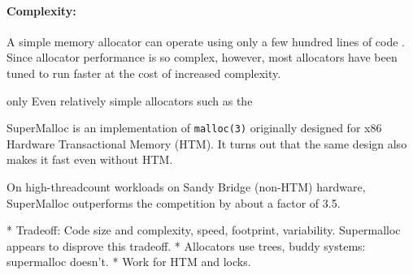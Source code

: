 \documentclass[pldi]{sigplanconf-pldi15}
\begin{document}
{\paragraph{Complexity:}} A simple memory allocator can operate using
only a few hundred lines of code \cite{KernighanRi88}.  Since
allocator performance is so complex, however, most allocators have
been tuned to run faster at the cost of increased complexity.  



only Even relatively simple allocators such as the

SuperMalloc is an implementation of \texttt{malloc(3)} originally designed for
x86 Hardware Transactional Memory (HTM).  
It turns out that the same
design also makes it fast even without HTM.  

On high-threadcount
workloads on Sandy Bridge (non-HTM) hardware, SuperMalloc outperforms
the competition by about a factor of 3.5.




* Tradeoff: Code size and complexity, speed, footprint, variability.  Supermalloc appears to disprove this tradeoff.
* Allocators use trees, buddy systems: supermalloc doesn't.
* Work for HTM and locks.
\end{document}
